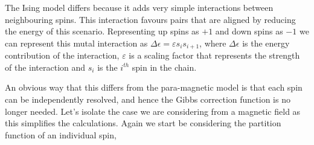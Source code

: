 \documentclass[a4paper]{article}
\begin{document}
\begin{multicols}{2}
        The Ising model differs because it adds very simple interactions %
        between neighbouring spins. This interaction favours pairs that %
        are aligned by reducing the energy of this scenario. Representing %
        up spins as \(+1\) and down spins as \(-1\) we can represent this %
        mutal interaction as \(\Delta \epsilon = \varepsilon s_{i}s_{i + 1}\), %
        where \(\Delta \epsilon\) is the energy contribution of the %
        interaction, \(\varepsilon\) is a scaling factor that represents %
        the strength of the interaction and \(s_{i}\) is the \(i^{th}\) %
        spin in the chain. 


        An obvious way that this differs from the para-magnetic model %
        is that each spin can be independently resolved, and hence %
        the Gibbs correction function is no longer needed. Let's isolate %
        the case we are considering from a magnetic field as this simplifies %
        the calculations. Again we start be considering the partition %
        function of an individual spin, 
        \end{multicols}
\end{document}
